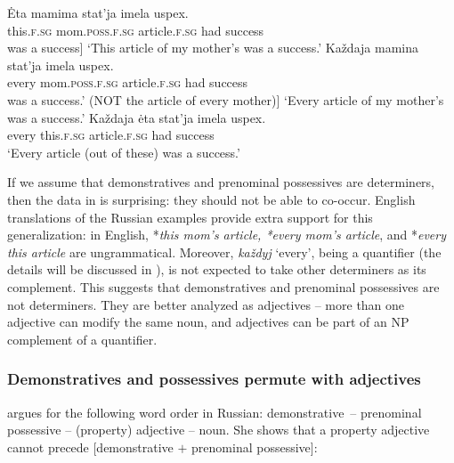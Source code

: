 \documentclass[output=paper]{langscibook}
\begin{document}
\ea\label{statja}
\ea\label{etastatja}
    \gll Ėta mamima stat'ja imela uspex.\\
    this.\textsc{f.sg} mom.\textsc{poss.f.sg} article.\textsc{f.sg} had success\\
    \glt [Literally: This [mom's article] was a success]
    \glt `This article of my mother's was a success.'
\ex\label{kazdajastatja}
    \gll Každaja mamina stat'ja imela uspex.\\
    every mom.\textsc{poss.f.sg} article.\textsc{f.sg} had success\\
    \glt [Literally: every [mom’s-article] was a success.' (NOT the article of every mother)]
    \glt `Every article of my mother's was a success.' 
\ex\label{kazdajaeta}
    \gll Každaja ėta stat'ja imela uspex.\\
    every this.\textsc{f.sg} article.\textsc{f.sg} had success\\
    \glt `Every article (out of these) was a success.'
\z\z

\noindent If we assume that demonstratives and prenominal possessives are determiners, then the data in  is surprising: they should not be able to co-occur. English translations of the Russian examples provide extra support for this generalization: in English, *\textit{this mom's article, *every mom's article}, and *\textit{every this article} are ungrammatical. Moreover, \textit{každyj} `every', being a quantifier (the details will be discussed in ), is not expected to take other determiners as its complement. This suggests that demonstratives and prenominal possessives are not determiners. They are better analyzed as adjectives -- more than one adjective can modify the same noun, and adjectives can be part of an NP complement of a quantifier. 


\subsubsection{Demonstratives and possessives permute with adjectives}

\citet{Pereltsvaig2007} %
argues for the following word order in Russian: demonstrative~-- prenominal possessive -- (property) adjective -- noun. She shows that a property adjective cannot precede [demonstrative $+$ prenominal possessive]:


\ea\label{Vanja}
\z\z
\end{document}
